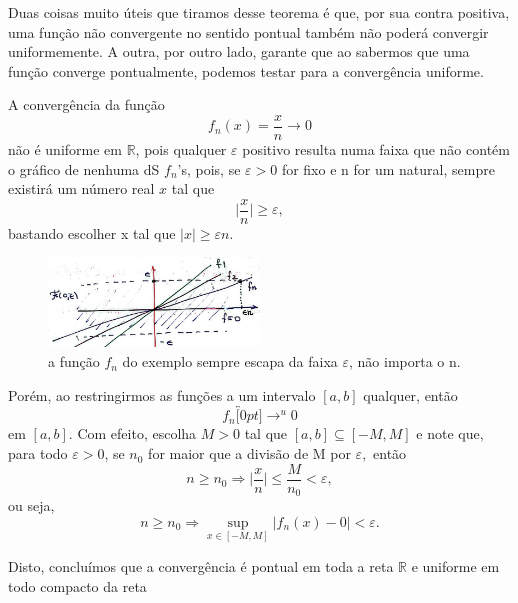 \documentclass[../analysisII_notes.tex]{subfiles}
\begin{document}
Duas coisas muito úteis que tiramos desse teorema é que, por sua contra positiva, uma função não convergente no sentido pontual também não poderá convergir uniformemente. A outra, por outro lado, garante que ao sabermos que uma função converge pontualmente, podemos testar para a convergência uniforme.
\begin{example}
	A convergência da função
	\[
		f_{n}(x)=\frac{x}{n}\rightarrow0
	\]
	não é uniforme em \(\mathbb{R}\), pois qualquer \(\varepsilon \) positivo resulta numa faixa que não contém o gráfico de nenhuma dS \(f_{n}\)'s, pois, se \(\varepsilon > 0\) for fixo e n for um natural, sempre existirá um número real \(x\) tal que
	\[
		\biggl\vert \frac{x}{n} \biggr\vert \geq \varepsilon ,
	\]
	bastando escolher x tal que \(|x|\geq \varepsilon n\).
	\begin{figure}[H]
		\begin{center}
			\includegraphics[height=0.5\textheight, width=0.5\textwidth, keepaspectratio]{./Images/converging_uniformly_16.png}
		\end{center}
		\caption{a função \(f_{n}\) do exemplo sempre escapa da faixa \(\varepsilon \), não importa o n.}
	\end{figure}

	Porém, ao restringirmos as funções a um intervalo \([a, b]\) qualquer, então
	\[
		f_{n}\overbracket[0pt]{\longrightarrow}^{u}0
	\]
	em \([a, b]\). Com efeito, escolha \(M>0\) tal que \([a, b]\subseteq [-M, M]\) e note que, para todo \(\varepsilon > 0\), se \(n_{0}\) for maior que a divisão de M por \(\varepsilon ,\) então
	\[
		n\geq n_{0} \Rightarrow \biggl\vert \frac{x}{n} \biggr\vert \leq \frac{M}{n_{0}}<\varepsilon ,
	\]
	ou seja,
	\[
		n\geq n_{0} \Rightarrow \sup_{x\in [-M, M]}|f_{n}(x)-0|<\varepsilon.
	\]

	Disto, concluímos que a convergência é pontual em toda a reta \(\mathbb{R}\) e uniforme em todo compacto da reta
\end{example}
\end{document}
